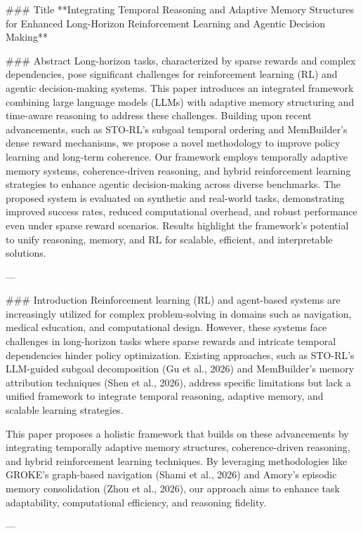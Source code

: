 ### Title  
**Integrating Temporal Reasoning and Adaptive Memory Structures for Enhanced Long-Horizon Reinforcement Learning and Agentic Decision Making**

### Abstract  
Long-horizon tasks, characterized by sparse rewards and complex dependencies, pose significant challenges for reinforcement learning (RL) and agentic decision-making systems. This paper introduces an integrated framework combining large language models (LLMs) with adaptive memory structuring and time-aware reasoning to address these challenges. Building upon recent advancements, such as STO-RL's subgoal temporal ordering and MemBuilder's dense reward mechanisms, we propose a novel methodology to improve policy learning and long-term coherence. Our framework employs temporally adaptive memory systems, coherence-driven reasoning, and hybrid reinforcement learning strategies to enhance agentic decision-making across diverse benchmarks. The proposed system is evaluated on synthetic and real-world tasks, demonstrating improved success rates, reduced computational overhead, and robust performance even under sparse reward scenarios. Results highlight the framework's potential to unify reasoning, memory, and RL for scalable, efficient, and interpretable solutions.

---

### Introduction  
Reinforcement learning (RL) and agent-based systems are increasingly utilized for complex problem-solving in domains such as navigation, medical education, and computational design. However, these systems face challenges in long-horizon tasks where sparse rewards and intricate temporal dependencies hinder policy optimization. Existing approaches, such as STO-RL's LLM-guided subgoal decomposition (Gu et al., 2026) and MemBuilder's memory attribution techniques (Shen et al., 2026), address specific limitations but lack a unified framework to integrate temporal reasoning, adaptive memory, and scalable learning strategies.

This paper proposes a holistic framework that builds on these advancements by integrating temporally adaptive memory structures, coherence-driven reasoning, and hybrid reinforcement learning techniques. By leveraging methodologies like GROKE's graph-based navigation (Shami et al., 2026) and Amory's episodic memory consolidation (Zhou et al., 2026), our approach aims to enhance task adaptability, computational efficiency, and reasoning fidelity.

---

